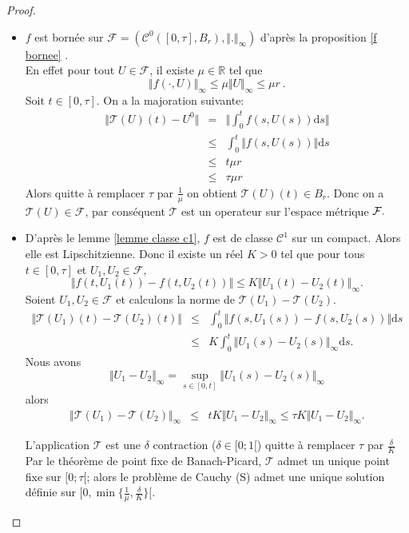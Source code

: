 \documentclass[12pt,a4paper,openany,oneside]{book}
\begin{document}
{{{{{{\begin{proof}
\begin{itemize}[label=$\bullet$]
 \item $ f $ est bornée sur $ \mathcal{F}=(\mathcal{C}^{0}([0,\tau],B_{r}),\Vert.\Vert_{\infty})$ d'après la proposition \ref{f bornee} . \\
 En effet pour tout $U \in \mathcal{F}$, il existe $\mu \in  \mathbb{R}$ tel que 
 $$ \Vert f(\cdot,U)\Vert_{\infty} \leq \mu \Vert U\Vert_{\infty}\leq \mu r \:.$$
   Soit $t \in [0,\tau].$ On a la majoration suivante:
 \begin{eqnarray*}
\Vert \mathcal{T}(U)(t)-U^{0}\Vert & = & \Vert\int_{0}^{t}f(s,U(s))\mathrm{d}s \Vert \\
 &\leq & \int_{0}^{t}\Vert f(s,U(s))\Vert \mathrm{d}s \\
& \leq & t\mu r\\
& \leq & \tau\mu r
\end{eqnarray*} 
Alors quitte à remplacer $\tau$ par $\frac{1}{\mu}$ on obtient $ \mathcal{T}(U)(t)\in B_{r} .$  Donc on a $\mathcal{T}(U)\in \mathcal{F}$, par conséquent $\mathcal{T}$ est un operateur sur l'espace métrique $\cal{F}.$
 
  \item D'après le lemme \ref{lemme classe c1}, $f$ est de classe $ \mathcal{C}^{1}$ sur un compact. Alors elle est Lipschitzienne. Donc il existe un réel $ K>0 $ tel que pour tous $ t\in [0,\tau]$ et $U_{1}, U_{2}\in \mathcal{F},$ 
  $$ \Vert f(t,U_{1}(t))-f(t,U_{2}(t))\Vert  \leq K\Vert U_{1}(t)-U_{2}(t)\Vert_{\infty} .$$
  Soient $U_{1}, U_{2}\in \mathcal{F}$ et calculons la norme de $\mathcal{T}(U_{1})-\mathcal{T}(U_{2}).$
\begin{eqnarray*}
\Vert \mathcal{T}(U_{1})(t)-\mathcal{T}(U_{2})(t)\Vert & \leq & \int_{0}^{t}\Vert f(s,U_{1}(s))-f(s,U_{2}(s))\Vert \mathrm{d}s \\
& \leq & K\int_{0}^{t}\Vert U_{1}(s)-U_{2}(s)\Vert_{\infty} \mathrm{d}s.
\end{eqnarray*}
Nous avons 
$$ \Vert U_{1}-U_{2}\Vert_{\infty} = \sup_{s\in[0,t]}\Vert U_{1}(s)-U_{2}(s)\Vert_{\infty} $$
alors 
\begin{eqnarray*}
\Vert \mathcal{T}(U_{1})-\mathcal{T}(U_{2})\Vert_{\infty} & \leq & tK \Vert U_{1}-U_{2}\Vert_{\infty}\leq  \tau K \Vert U_{1}-U_{2}\Vert_{\infty}.
\end{eqnarray*}

L'application $\mathcal{T}$ est une $\delta $ contraction ($\delta\in [0;1[$) quitte à remplacer $\tau$ par $ \frac{\delta}{K}$\\
Par le théorème de point ﬁxe de Banach-Picard, $\mathcal{T}$  admet un unique point ﬁxe sur $[0;\tau[$; alors le problème de Cauchy (S) admet une unique solution définie sur $[0,\min\{\frac{1}{\mu},\frac{\delta}{K}\}[ .$


\end{itemize}
\end{proof}}}}}}}
\end{document}
